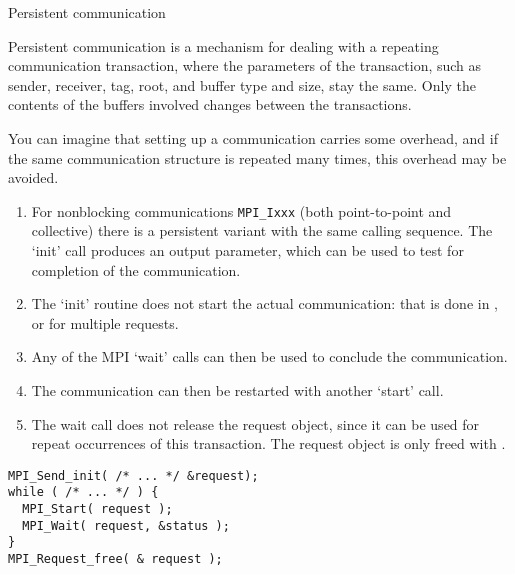 
 {Persistent communication}
\label{sec:persistent}

Persistent communication is a mechanism for dealing
with a repeating communication transaction,
where the parameters of the transaction,
such as sender, receiver, tag, root, and buffer type and size,
stay the same.
Only the contents of the buffers involved changes between the transactions.

You can imagine that setting up a communication
carries some overhead, and if the same communication structure
is repeated many times, this overhead may be avoided.

\begin{enumerate}
\item
  For nonblocking communications \lstinline{MPI_Ixxx}
  (both point-to-point and collective)
  there is a persistent variant 
  with the same calling sequence.
  The `init' call produces
  an  output parameter,
  which can be used to test for completion of the communication.
\item 
  The `init' routine does not start the actual communication:
  that is done in
  ,
  or  for multiple requests.
\item Any of the MPI `wait' calls can then be used
  to conclude the communication.
\item The communication can then be restarted with another `start' call.
\item The wait call does not release the request object,
  since it can be used for repeat occurrences of this transaction.
  The request object is only freed with .
\end{enumerate}

\begin{lstlisting}
MPI_Send_init( /* ... */ &request);
while ( /* ... */ ) {
  MPI_Start( request );
  MPI_Wait( request, &status );
}
MPI_Request_free( & request );
\end{lstlisting}

